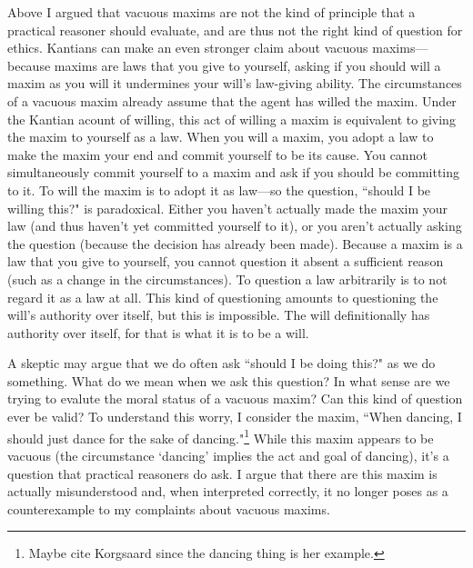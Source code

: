 \begin{isabellebody}
\begin{isamarkuptext}
Above I argued that vacuous maxims are not the kind of principle that a practical reasoner should 
evaluate, and are thus not the right kind of question for ethics. Kantians can make an even stronger claim
about vacuous maxims—because maxims are laws that you give to yourself, asking if you should will 
a maxim as you will it undermines your will's law-giving ability. The circumstances of a vacuous maxim 
already assume that the agent has willed the maxim. Under the Kantian acount of willing, this act 
of willing a maxim is equivalent to giving the maxim to yourself as a law. When you will a maxim, you
adopt a law to make the maxim your end and commit yourself to be its cause. You cannot simultaneously 
commit yourself to a maxim and ask if you should be committing to it. To 
will the maxim is to adopt it as law—so the question, ``should I be 
willing this?" is paradoxical. Either you haven't actually made the maxim your law (and thus haven't yet 
committed yourself to it), or you aren't actually asking the question (because the decision has already been made).
Because a maxim is a law that you give to yourself, you cannot question it absent a sufficient reason 
(such as a change in the circumstances). To question a law arbitrarily is to not regard it as a law at all.
This kind of questioning amounts to questioning the will's authority over itself, but this is 
impossible. The will definitionally has authority over itself, for that is what it is to be a 
will. 

A skeptic may argue that we do often ask ``should I be doing this?" as we do something. What do we mean when 
we ask this question? In what sense are we trying to evalute the moral status of a vacuous maxim?
Can this kind of question ever be valid? To understand this worry, I consider the maxim, 
``When dancing, I should just dance for the sake of dancing."\footnote{Maybe cite Korgsaard since the
dancing thing is her example.} While this maxim appears to be vacuous (the 
circumstance `dancing' implies the act and goal of dancing), it's a question that practical reasoners 
do ask. I argue that there are this maxim is actually misunderstood and, when interpreted correctly,
it no longer poses as a counterexample to my complaints about vacuous maxims.


\end{isamarkuptext}
\end{isabellebody}
